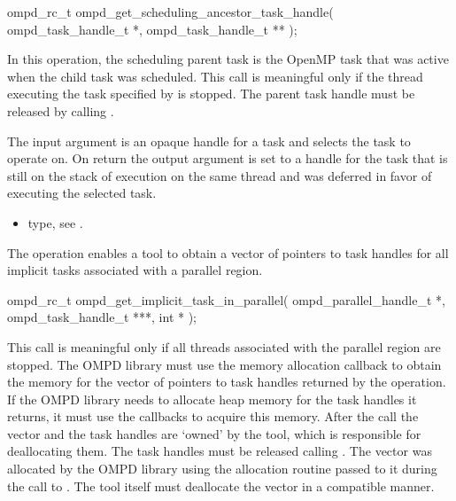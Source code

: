 \format

\begin{cspecific}
\begin{ompSyntax}
ompd_rc_t ompd_get_scheduling_ancestor_task_handle(
  ompd_task_handle_t *,
  ompd_task_handle_t **
);
\end{ompSyntax}
\end{cspecific}


\descr
In this operation, the scheduling parent task is the OpenMP task that was active when
the child task was scheduled. This call is meaningful only if the thread executing the task specified 
by   is stopped. The parent task handle must be released by calling 
.

\argdesc
The input argument  is an opaque handle for a task and selects the task to operate on.
On return the output argument  is set to a handle for the task that is 
still on the stack of execution on the same thread and was deferred in favor of executing the selected task.

\crossreferences
\begin{itemize}
	\item {} type, see .
\end{itemize}

\label{subsubsubsec:ompd_get_implicit_task_in_parallel}
\summary
The   operation enables a tool to obtain a 
vector of pointers to task handles for all implicit tasks associated with a parallel region.

\format

\begin{cspecific}
\begin{ompSyntax}
ompd_rc_t ompd_get_implicit_task_in_parallel(
  ompd_parallel_handle_t *,
  ompd_task_handle_t ***,
  int *
);
\end{ompSyntax}
\end{cspecific}


\descr
This call is meaningful only if all threads associated with the parallel region are stopped.
The OMPD library must use the memory allocation callback to obtain the memory for the vector of 
pointers to task handles returned by the operation. If the OMPD library needs to allocate 
heap memory for the task handles it returns, it must use the callbacks to acquire this memory.
After the call the vector and the task handles are `owned' by the tool, which is responsible for 
deallocating them. The task handles must be released calling .
The vector was allocated by the OMPD library using the
allocation routine passed to it during the call to .
The tool itself must deallocate the vector in a compatible manner.

